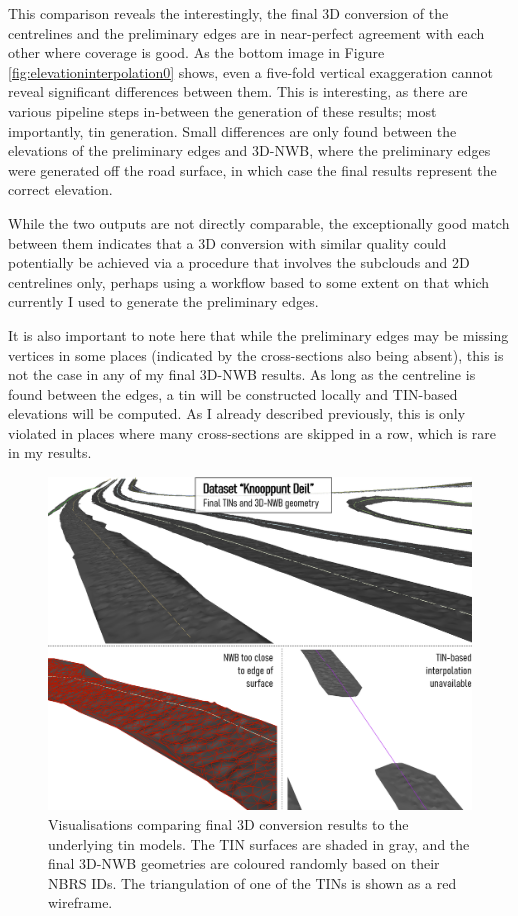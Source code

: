 This comparison reveals the interestingly, the final 3D conversion of the centrelines and the preliminary edges are in near-perfect agreement with each other where coverage is good. As the bottom image in Figure \ref{fig:elevationinterpolation0} shows, even a five-fold vertical exaggeration cannot reveal significant differences between them. This is interesting, as there are various pipeline steps in-between the generation of these results; most importantly, \ac{tin} generation. Small differences are only found between the elevations of the preliminary edges and 3D-NWB, where the preliminary edges were generated off the road surface, in which case the final results represent the correct elevation.

While the two outputs are not directly comparable, the exceptionally good match between them indicates that a 3D conversion with similar quality could potentially be achieved via a procedure that involves the subclouds and 2D centrelines only, perhaps using a workflow based to some extent on that which currently I used to generate the preliminary edges.

It is also important to note here that while the preliminary edges may be missing vertices in some places (indicated by the cross-sections also being absent), this is not the case in any of my final 3D-NWB results. As long as the centreline is found between the edges, a \ac{tin} will be constructed locally and TIN-based elevations will be computed. As I already described previously, this is only violated in places where many cross-sections are skipped in a row, which is rare in my results.

\begin{figure}[h]
    \centering
    \includegraphics[width=0.9\linewidth]{final_report/figs/elevationinterpolation1.png}
    \caption[Renders comparing final 3D-NWB geometries with the underlying TIN models]{Visualisations comparing final 3D conversion results to the underlying \ac{tin} models. The TIN surfaces are shaded in gray, and the final 3D-NWB geometries are coloured randomly based on their NBRS IDs. The triangulation of one of the TINs is shown as a red wireframe.}
    \label{fig:elevationinterpolation1}
\end{figure}

